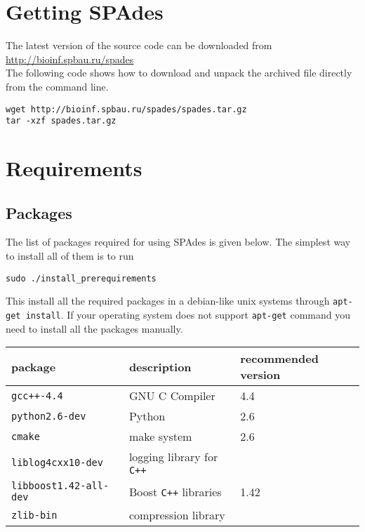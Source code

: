 \documentclass{article}
\def\spades{SPAdes}
\begin{document}
\section{Getting {\spades}}
The latest version of the source code can be downloaded from\\
\url{http://bioinf.spbau.ru/spades}\\
The following code shows how to download and unpack the archived file
directly from the command line.

\begin{lstlisting}
wget http://bioinf.spbau.ru/spades/spades.tar.gz
tar -xzf spades.tar.gz
\end{lstlisting}

\section{Requirements}\label{section:requirements}
\subsection{Packages}\label{subsection:packages}
The list of packages required for using {\spades} is given below.
The simplest way to install all of them is to run
\begin{lstlisting}
sudo ./install_prerequirements
\end{lstlisting}
This install all the required packages in a debian-like unix systems through {\tt apt-get install}.
If your operating system does not support {\tt apt-get} command you
need to install all the packages manually. 

\begin{center}
\begin{tabular}{lll}
\toprule
package & description & recommended version\\
\midrule
{\tt gcc++-4.4} & GNU C Compiler & 4.4\\
{\tt python2.6-dev} & Python & 2.6\\
{\tt cmake} & make system & 2.6\\
{\tt liblog4cxx10-dev} & logging library for {\tt C++} & \\
{\tt libboost1.42-all-dev} & Boost {\tt C++} libraries & 1.42\\
{\tt zlib-bin} & compression library & \\
\bottomrule
\end{tabular}
\end{center}
\end{document}
